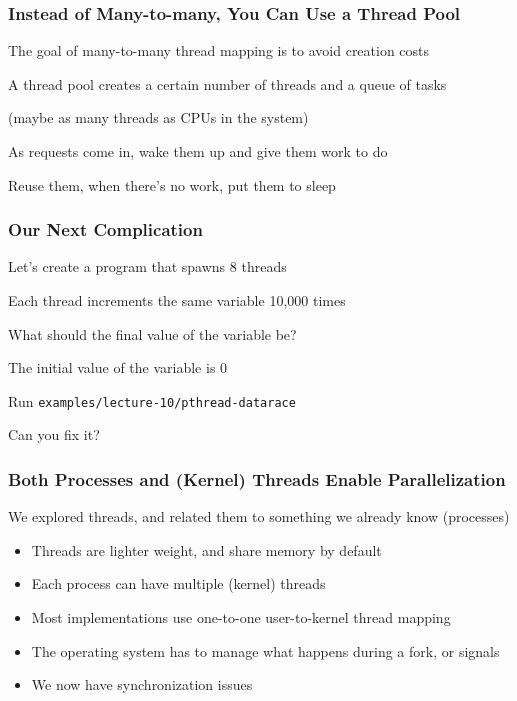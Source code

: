   \begin{frame}
    \frametitle{Instead of Many-to-many, You Can Use a Thread Pool}

    The goal of many-to-many thread mapping is to avoid creation costs

    \vspace{2em}

    A thread pool creates a certain number of threads and a queue of tasks

    \hspace{2em} (maybe as many threads as CPUs in the system)

    \vspace{2em}

    As requests come in, wake them up and give them work to do

    \vspace{2em}

    Reuse them, when there's no work, put them to sleep
  \end{frame}

  \begin{frame}
    \frametitle{Our Next Complication}

    Let's create a program that spawns 8 threads

    \hspace{2em} Each thread increments the same variable 10,000 times

    \vspace{2em}

    What should the final value of the variable be?

    \hspace{2em} The initial value of the variable is 0

    \vspace{2em}

    Run \texttt{examples/lecture-10/pthread-datarace}

    \hspace{2em} Can you fix it?
  \end{frame}

  \begin{frame}
    \frametitle{Both Processes and (Kernel) Threads Enable Parallelization}

    We explored threads, and related them to something we already know (processes)
    \begin{itemize}
      \item Threads are lighter weight, and share memory by default
      \item Each process can have multiple (kernel) threads
      \item Most implementations use one-to-one user-to-kernel thread mapping
      \item The operating system has to manage what happens during a fork, or signals
      \item We now have synchronization issues
    \end{itemize}
  \end{frame}

